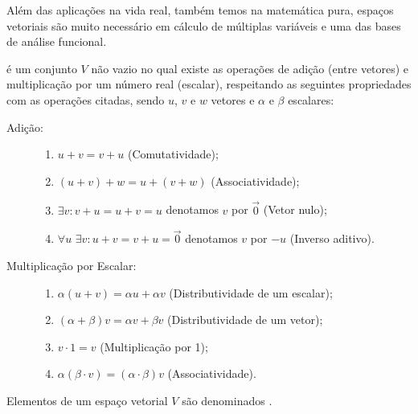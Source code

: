 \documentclass[../main.tex]{subfiles}
\begin{document}
	Além das aplicações na vida real, também temos na matemática pura, espaços vetoriais são muito necessário em cálculo de múltiplas variáveis e uma das bases de análise funcional.
	
	\begin{definicao}
		 é um conjunto $V$ não vazio no qual existe as operações de adição (entre vetores) e multiplicação por um número real (escalar), respeitando as seguintes propriedades com as operações citadas, sendo $u$, $v$ e $w$ vetores e $\alpha$ e $\beta$ escalares:
		
			\begin{description}
				\item[Adição:] \hfill 
				\begin{enumerate}
					\item[(A1)] $u + v = v + u$ (Comutatividade);
					\item[(A2)] $(u + v) + w = u + (v + w)$ (Associatividade);
					\item[(A3)] $ \exists v : v + u = u + v = u $ denotamos $v$ por $\vec{0}$ (Vetor nulo);
					\item[(A4)] $\forall u \, \, \exists v : u + v = v + u = \vec{0}$ denotamos $v$ por $-u$ (Inverso aditivo).
				\end{enumerate}
				
				\item[Multiplicação por Escalar:] \hfill 
				\begin{enumerate}
					\item[(M1)] $\alpha(u + v) = \alpha u + \alpha v$ (Distributividade de um escalar);
					\item[(M2)] $(\alpha + \beta)v = \alpha v + \beta v$ (Distributividade de um vetor);
					\item[(M3)] $v \cdot 1 = v$ (Multiplicação por 1);
					\item[(M4)] $\alpha (\beta \cdot v) = (\alpha \cdot \beta)v$ (Associatividade).
				\end{enumerate}
			\end{description}
	\end{definicao}
	\begin{definicao}
		Elementos de um espaço vetorial $V$ são denominados \azul{vetores}.
	\end{definicao}
\end{document}
